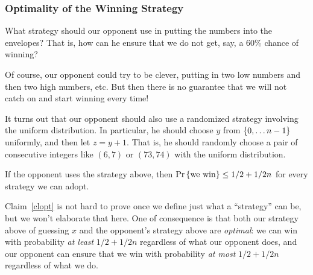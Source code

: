 \documentclass[11pt,twoside]{article}
\begin{document}
\subsubsection{Optimality of the Winning Strategy}

What strategy should our opponent use in putting the numbers into the
envelopes?  That is, how can he ensure that we do not get, say, a 60\%
chance of winning?

Of course, our opponent could try to be clever, putting in two low
numbers and then two high numbers, etc.  But then there is no
guarantee that we will not catch on and start winning every time!

It turns out that our opponent should also use a randomized strategy
involving the uniform distribution.  In particular, he should choose $y$
from $\left\{0,\dots n-1\right\}$ uniformly, and then let $z = y+1$.  That is, he
should randomly choose a pair of consecutive integers like $(6,7)$ or
$(73, 74)$ with the uniform distribution.

\begin{claim}\label{clopt}
If the opponent uses the strategy above, then $\mathop{\textup{Pr}}\nolimits\left\{\mbox{we win}\right\} \leq
1/2 + 1/2n$ for every strategy we can adopt.
\end{claim}
Claim~\ref{clopt} is not hard to prove once we define just what a
``strategy'' can be, but we won't elaborate that here.  One of consequence
is that both our strategy above of guessing $x$ and the opponent's
strategy above are \emph{optimal}: we can win with probability \emph{at
least} $1/2 + 1/2n$ regardless of what our opponent does, and our opponent
can ensure that we win with probability \emph{at most} $1/2 + 1/2n$
regardless of what we do.

\end{document}
